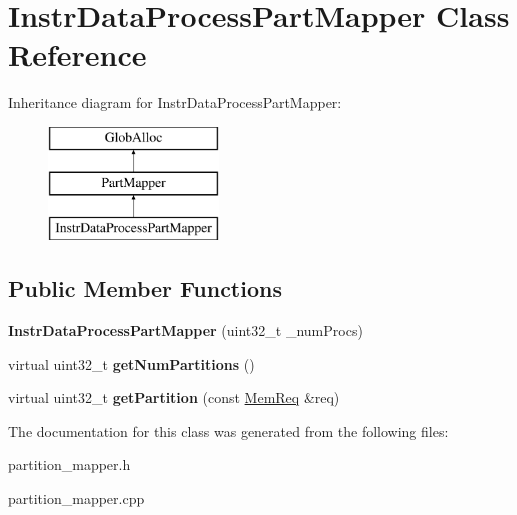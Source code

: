 \hypertarget{classInstrDataProcessPartMapper}{\section{Instr\-Data\-Process\-Part\-Mapper Class Reference}
\label{classInstrDataProcessPartMapper}
}
Inheritance diagram for Instr\-Data\-Process\-Part\-Mapper\-:\begin{figure}[H]
\begin{center}
\leavevmode
\includegraphics[height=3.000000cm]{classInstrDataProcessPartMapper}
\end{center}
\end{figure}
\subsection*{Public Member Functions}
\begin{DoxyCompactItemize}
\item 
\hypertarget{classInstrDataProcessPartMapper_a9ec951513521573dfa456c182c87d2bd}{{\bfseries Instr\-Data\-Process\-Part\-Mapper} (uint32\-\_\-t \-\_\-num\-Procs)}\label{classInstrDataProcessPartMapper_a9ec951513521573dfa456c182c87d2bd}

\item 
\hypertarget{classInstrDataProcessPartMapper_ad33080da0f9a80997cf670d911db1d3f}{virtual uint32\-\_\-t {\bfseries get\-Num\-Partitions} ()}\label{classInstrDataProcessPartMapper_ad33080da0f9a80997cf670d911db1d3f}

\item 
\hypertarget{classInstrDataProcessPartMapper_a310854ad8ab4e249216ccb7b0dc6c917}{virtual uint32\-\_\-t {\bfseries get\-Partition} (const \hyperlink{structMemReq}{Mem\-Req} \&req)}\label{classInstrDataProcessPartMapper_a310854ad8ab4e249216ccb7b0dc6c917}

\end{DoxyCompactItemize}


The documentation for this class was generated from the following files\-:\begin{DoxyCompactItemize}
\item 
partition\-\_\-mapper.\-h\item 
partition\-\_\-mapper.\-cpp\end{DoxyCompactItemize}
